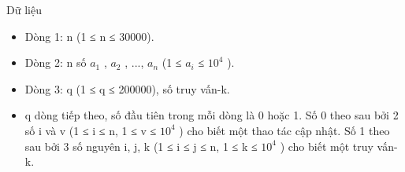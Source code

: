 Dữ liệu
\begin{itemize}
	\item     Dòng 1: n (1 ≤ n ≤ 30000).   
	\item     Dòng 2: n số $a_{1}$    , $a_{2}$    , ...,   $a_{n}$    (1 ≤ $a_{i}$    ≤   $10^{4}$    ).   
	\item     Dòng 3: q (1 ≤ q ≤ 200000), số truy vấn-k.   
	\item     q dòng tiếp theo, số đầu tiên trong mỗi dòng là 0 hoặc 1. Số 0 theo sau bởi 2 số i và v (1 ≤ i ≤ n, 1 ≤ v ≤ $10^{4}$    ) cho biết một thao tác cập nhật. Số 1 theo sau bởi 3 số nguyên i, j, k (1 ≤ i ≤ j ≤ n, 1 ≤ k ≤ $10^{4}$    ) cho biết một truy vấn-k.   
\end{itemize}